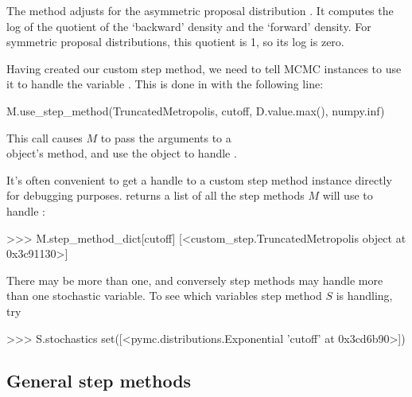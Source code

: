 \documentclass[]{jss}
\begin{document}
The  method adjusts for the asymmetric proposal distribution \citep{gelman}. It computes the log of the quotient of the `backward' density and the `forward' density. For symmetric proposal distributions, this quotient is 1, so its log is zero. 

\medskip
Having created our custom step method, we need to tell MCMC instances to use it to handle the variable . This is done in  with the following line:
\begin{CodeInput}
M.use_step_method(TruncatedMetropolis, cutoff, D.value.max(), numpy.inf)
\end{CodeInput}
This call causes $M$ to pass the arguments  to a \\ object's  method, and use the object to handle .

\medskip
It's often convenient to get a handle to a custom step method instance directly for debugging purposes.  returns a list of all the step methods $M$ will use to handle :
\begin{CodeInput}
>>> M.step_method_dict[cutoff]
[<custom_step.TruncatedMetropolis object at 0x3c91130>]
\end{CodeInput}
There may be more than one, and conversely step methods may handle more than one stochastic variable. To see which variables step method $S$ is handling, try
\begin{CodeInput}
>>> S.stochastics
set([<pymc.distributions.Exponential 'cutoff' at 0x3cd6b90>])
\end{CodeInput}


\subsection{General step methods} \label{user-gen}
\end{document}
